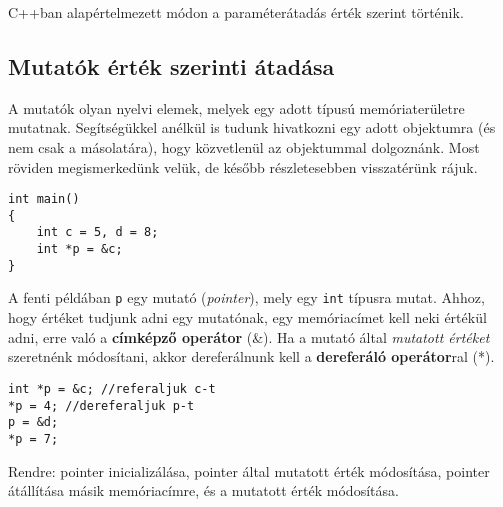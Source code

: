 \documentclass[a4paper,11.5pt,table]{article}
\begin{document}
	\begin{figure}[!h]
		\centering
		\smallskip
	\end{figure}
	C++ban alapértelmezett módon a paraméterátadás érték szerint történik.
	\subsection{Mutatók érték szerinti átadása}
	A mutatók olyan nyelvi elemek, melyek egy adott típusú memóriaterületre mutatnak. Segítségükkel anélkül is tudunk hivatkozni egy adott objektumra (és nem csak a másolatára), hogy közvetlenül az objektummal dolgoznánk. Most röviden megismerkedünk velük, de később részletesebben visszatérünk rájuk.
	\begin{lstlisting}
int main()
{
	int c = 5, d = 8;
	int *p = &c;
}
	\end{lstlisting}
	A fenti példában \texttt{p} egy mutató (\textit{pointer}), mely egy \texttt{int} típusra mutat. Ahhoz, hogy értéket tudjunk adni egy mutatónak, egy memóriacímet kell neki értékül adni, erre való a \textbf{címképző operátor} (\&). Ha a mutató által \textit{mutatott értéket} szeretnénk módosítani, akkor dereferálnunk kell a \textbf{dereferáló operátor}ral (*).
	\begin{lstlisting}
int *p = &c; //referaljuk c-t
*p = 4; //dereferaljuk p-t
p = &d;
*p = 7;
	\end{lstlisting}
	Rendre: pointer inicializálása, pointer által mutatott érték módosítása, pointer átállítása másik memóriacímre, és a mutatott érték módosítása.
	
\end{document}
